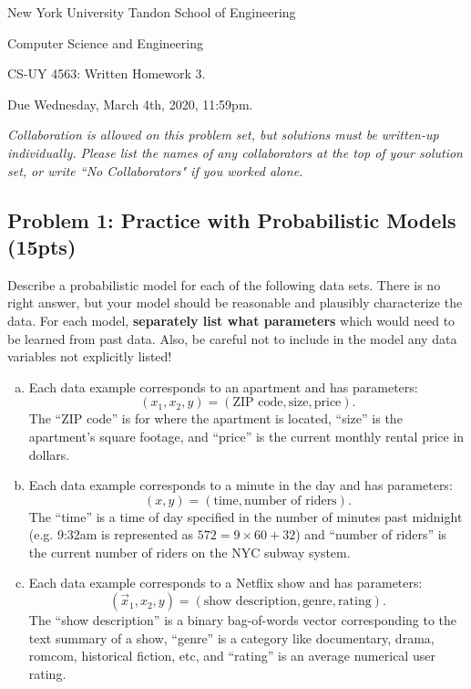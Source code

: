 \documentclass[10pt]{article}
\begin{document}
	
\begin{center}
	\normalsize
	New York University Tandon School of Engineering
	
	Computer Science and Engineering
	\medskip
	
	\large
	CS-UY 4563: Written Homework 3. 
	
	Due Wednesday, March 4th, 2020, 11:59pm.
	\medskip
	
	\normalsize 
	\noindent \emph{Collaboration is allowed on this problem set, but solutions must be written-up individually. Please list the names of any collaborators at the top of your solution set, or write ``No Collaborators" if you worked alone.}
	\medskip
\end{center} 

\subsection{Problem 1: Practice with Probabilistic Models (15pts)}
Describe a probabilistic model for each of the following data sets. There is no right answer, but your model should be reasonable and plausibly characterize the data. For each model, \textbf{separately list what parameters} which would need to be learned from past data. Also, be careful not to include in the model any data variables not explicitly listed!
\begin{enumerate}[(a)]
	\item Each data example corresponds to an apartment and has parameters: $$(x_1,x_2, y) = (\text{ZIP code}, \text{size}, \text{price}).$$ The ``ZIP code'' is for where the apartment is located, ``size'' is the apartment's square footage, and ``price'' is the current monthly rental price in dollars. 

	\item Each data example corresponds to a minute in the day and has parameters: $$(x,y) = (\text{time}, \text{number of riders}).$$ The ``time''  is a time of day specified in the number of minutes past midnight (e.g. 9:32am is represented as $572 = 9\times 60 + 32$) and ``number of riders'' is the current number of riders on the NYC subway system.
	
	\item Each data example corresponds to a Netflix show and has parameters: $$(\vec{x}_1, x_2, y) = (\text{show description}, \text{genre}, \text{rating}).$$  The ``show description'' is a binary bag-of-words vector corresponding to the text summary of a show, ``genre'' is a category like documentary, drama, romcom, historical fiction, etc, and ``rating'' is an average numerical user rating.
	
\end{enumerate}
\end{document}
